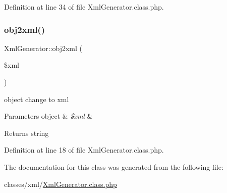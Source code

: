 Definition at line 34 of file Xml\+Generator.\+class.\+php.

\hypertarget{classXmlGenerator_ae887d13949d0ec6537feb11f6d9aa00f}{}\label{classXmlGenerator_ae887d13949d0ec6537feb11f6d9aa00f} 
\subsubsection{\texorpdfstring{obj2xml()}{obj2xml()}}
{\footnotesize\ttfamily Xml\+Generator\+::obj2xml (\begin{DoxyParamCaption}\item[{}]{\$xml }\end{DoxyParamCaption})}

object change to xml 
\begin{DoxyParams}[1]{Parameters}
object & {\em \$xml} & \\
\hline
\end{DoxyParams}
\begin{DoxyReturn}{Returns}
string 
\end{DoxyReturn}


Definition at line 18 of file Xml\+Generator.\+class.\+php.



The documentation for this class was generated from the following file\+:\begin{DoxyCompactItemize}
\item 
classes/xml/\hyperlink{XmlGenerator_8class_8php}{Xml\+Generator.\+class.\+php}\end{DoxyCompactItemize}
